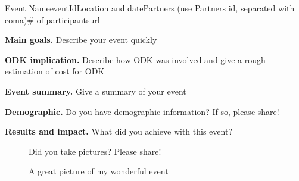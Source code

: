\begin{event}{Event Name}{eventId}{Location and date}{Partners (use Partners id, separated with coma)}{# of participants}{url}

\textbf{Main goals.} Describe your event quickly

\textbf{ODK implication.} Describe how ODK was involved and give a rough estimation of cost for ODK

\textbf{Event summary.} Give a summary of your event

\textbf{Demographic.} Do you have demographic information? If so, please share!

\textbf{Results and impact.} What did you achieve with this event?

\begin{figure}[ht]
\caption*{A great picture of my wonderful event}
Did you take pictures? Please share!
\end{figure}



\end{event}